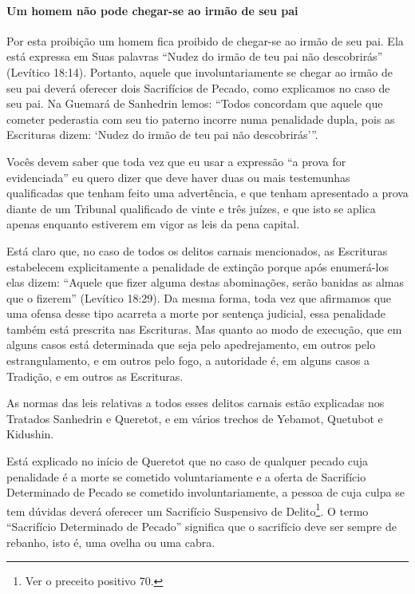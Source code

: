 \paragraph{Um homem não pode chegar-se ao irmão de seu pai}

Por esta proibição um homem fica proibido de chegar-se ao irmão de seu
pai. Ela está expressa em Suas palavras ``Nudez do irmão de teu pai não
descobrirás'' (Levítico 18:14). Portanto, aquele que involuntariamente
se chegar ao irmão de seu pai deverá oferecer dois Sacrifícios de
Pecado, como explicamos no caso de seu pai. Na Guemará de Sanhedrin
lemos: ``Todos concordam que aquele que cometer pederastia com seu tio
paterno incorre numa penalidade dupla, pois as Escrituras dizem: `Nudez
do irmão de teu pai não descobrirás'''.

Vocês devem saber que toda vez que eu usar a expressão ``a prova
for evidenciada'' eu quero dizer que deve haver duas ou mais testemunhas
qualificadas que tenham feito uma advertência, e que tenham apresentado
a prova diante de um Tribunal qualificado de vinte e três juízes, e que
isto se aplica apenas enquanto estiverem em vigor as leis da pena
capital.

Está claro que, no caso de todos os delitos carnais mencionados, as
Escrituras estabelecem explicitamente a penalidade de extinção porque
após enumerá-los elas dizem: ``Aquele que fizer alguma destas
abominações, serão banidas as almas que o fizerem'' (Levítico 18:29). Da
mesma forma, toda vez que afirmamos que uma ofensa desse tipo acarreta a
morte por sentença judicial, essa penalidade também está prescrita nas
Escrituras. Mas quanto ao modo de execução, que em alguns casos está
determinada que seja pelo apedrejamento, em outros pelo estrangulamento,
e em outros pelo fogo, a autoridade é, em alguns casos a Tradição, e em
outros as Escrituras.

As normas das leis relativas a todos esses delitos carnais estão
explicadas nos Tratados Sanhedrin e Queretot, e em vários trechos de
Yebamot, Quetubot e Kidushin.

Está explicado no início de Queretot que no caso de qualquer pecado
cuja penalidade é a morte se cometido voluntariamente e a oferta de
Sacrifício Determinado de Pecado se cometido involuntariamente, a
pessoa de cuja culpa se tem dúvidas deverá oferecer um Sacrifício
Suspensivo de Delito\footnote{Ver o preceito positivo 70.}. O termo ``Sacrifício
Determinado de Pecado'' significa que o sacrifício deve ser sempre de
rebanho, isto é, uma ovelha ou uma cabra.

